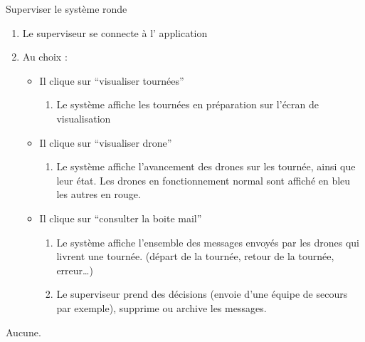 \begin{UseCase}{Superviser le système ronde}
\begin{UseCaseScenario}
        \begin{enumerate}
            \item Le superviseur se connecte à l’ application
            \item Au choix :
                \begin{itemize}
                    \item Il clique sur “visualiser tournées”
                        \begin{enumerate}
                            \item Le système affiche les tournées en
                                préparation sur l’écran de visualisation
                        \end{enumerate}
                    \item Il clique sur “visualiser drone”
                        \begin{enumerate}
                            \item Le système affiche l'avancement des
                                drones sur les tournée, ainsi que leur état.
                                Les drones en fonctionnement normal
                                sont affiché en bleu les autres en rouge.
                        \end{enumerate}
                    \item Il clique sur “consulter la boite mail”
                        \begin{enumerate}
                            \item Le système affiche l’ensemble des messages envoyés
                            par les drones qui livrent une tournée.
                            (départ de la tournée, retour de la tournée, erreur…)
                            \item Le superviseur prend des décisions (envoie
                                d’une équipe de secours par exemple), supprime
                                ou archive les messages.
                        \end{enumerate}
                \end{itemize}
        \end{enumerate}
\end{UseCaseScenario}

\begin{UseCaseExtension}
    Aucune.
\end{UseCaseExtension}

 \end{UseCase}

